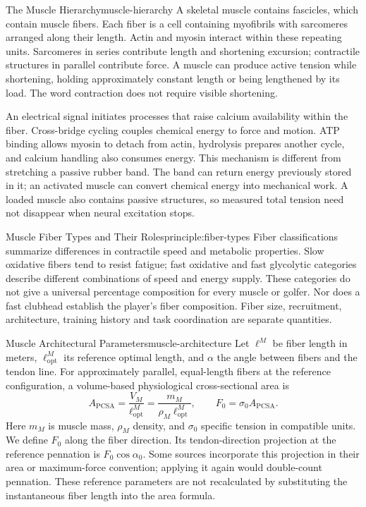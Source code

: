 \begin{definition}{The Muscle Hierarchy}{muscle-hierarchy}
A skeletal muscle contains fascicles, which contain muscle fibers. Each fiber is a cell containing myofibrils with sarcomeres arranged along their length. Actin and myosin interact within these repeating units. Sarcomeres in series contribute length and shortening excursion; contractile structures in parallel contribute force. A muscle can produce active tension while shortening, holding approximately constant length or being lengthened by its load. The word contraction does not require visible shortening.
\end{definition}

An electrical signal initiates processes that raise calcium availability within the fiber. Cross-bridge cycling couples chemical energy to force and motion. ATP binding allows myosin to detach from actin, hydrolysis prepares another cycle, and calcium handling also consumes energy. This mechanism is different from stretching a passive rubber band. The band can return energy previously stored in it; an activated muscle can convert chemical energy into mechanical work. A loaded muscle also contains passive structures, so measured total tension need not disappear when neural excitation stops. \citep{OpenStax2022Contraction}

\begin{principle}{Muscle Fiber Types and Their Roles}{principle:fiber-types}
Fiber classifications summarize differences in contractile speed and metabolic properties. Slow oxidative fibers tend to resist fatigue; fast oxidative and fast glycolytic categories describe different combinations of speed and energy supply. These categories do not give a universal percentage composition for every muscle or golfer. Nor does a fast clubhead establish the player's fiber composition. Fiber size, recruitment, architecture, training history and task coordination are separate quantities. \citep{OpenStax2022FiberTypes}
\end{principle}

\begin{definition}{Muscle Architectural Parameters}{muscle-architecture}
Let $\ell^M$ be fiber length in meters, $\ell^M_{\mathrm{opt}}$ its reference optimal length, and $\alpha$ the angle between fibers and the tendon line. For approximately parallel, equal-length fibers at the reference configuration, a volume-based physiological cross-sectional area is
\[
A_{\mathrm{PCSA}}=\frac{V_M}{\ell^M_{\mathrm{opt}}}
=\frac{m_M}{\rho_M\ell^M_{\mathrm{opt}}},
\qquad F_0=\sigma_0 A_{\mathrm{PCSA}}.
\]
Here $m_M$ is muscle mass, $\rho_M$ density, and $\sigma_0$ specific tension in compatible units. We define $F_0$ along the fiber direction. Its tendon-direction projection at the reference pennation is $F_0\cos\alpha_0$. Some sources incorporate this projection in their area or maximum-force convention; applying it again would double-count pennation. These reference parameters are not recalculated by substituting the instantaneous fiber length into the area formula.
\end{definition}

